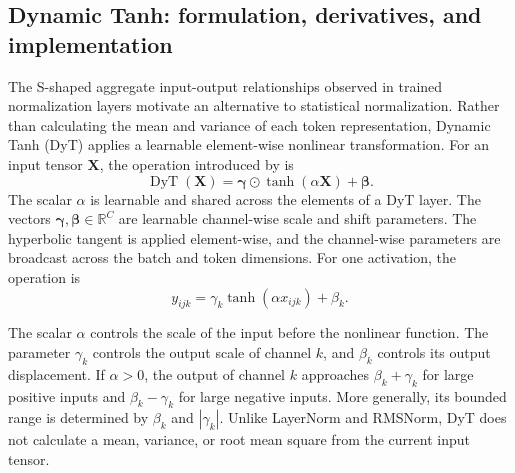 \subsection{Dynamic Tanh: formulation, derivatives, and implementation}
\label{subsec:norm-dyt-formulation}

The S-shaped aggregate input-output relationships observed in trained
normalization layers motivate an alternative to statistical normalization.
Rather than calculating the mean and variance of each token representation,
Dynamic Tanh (DyT) applies a learnable element-wise nonlinear transformation.
For an input tensor \(\mathbf{X}\), the operation introduced by
\textcite{zhu2025dyt} is
\begin{equation}
    \boxed{
    \operatorname{DyT}(\mathbf{X})
    =
    \boldsymbol{\gamma}\odot
    \tanh(\alpha\mathbf{X})
    +
    \boldsymbol{\beta}.
    }
    \label{eq:norm-dyt}
\end{equation}
The scalar \(\alpha\) is learnable and shared across the elements of a DyT
layer. The vectors
\(\boldsymbol{\gamma},\boldsymbol{\beta}\in\mathbb{R}^{C}\) are
learnable channel-wise scale and shift parameters. The hyperbolic tangent
is applied element-wise, and the channel-wise parameters are broadcast
across the batch and token dimensions. For one activation, the operation
is
\begin{equation}
    y_{ijk}
    =
    \gamma_k\tanh(\alpha x_{ijk})+\beta_k.
    \label{eq:norm-dyt-component}
\end{equation}

The scalar \(\alpha\) controls the scale of the input before the nonlinear
function. The parameter \(\gamma_k\) controls the output scale of channel
\(k\), and \(\beta_k\) controls its output displacement. If \(\alpha>0\),
the output of channel \(k\) approaches
\(\beta_k+\gamma_k\) for large positive inputs and
\(\beta_k-\gamma_k\) for large negative inputs. More generally, its
bounded range is determined by \(\beta_k\) and \(|\gamma_k|\). Unlike
LayerNorm and RMSNorm, DyT does not calculate a mean, variance, or root
mean square from the current input tensor.

